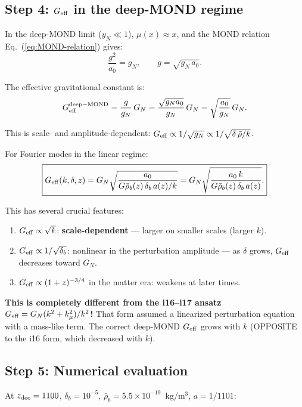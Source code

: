 \documentclass[11pt]{article}
\newcommand{\ee}[1]{\times 10^{#1}}
\newcommand{\Geff}{G_{\rm eff}}
\newcommand{\kmu}{k_\mu}
\begin{document}
\subsection{Step 4: $\Geff$ in the deep-MOND regime}

In the deep-MOND limit ($y_N \ll 1$), $\mu(x) \approx x$, and
the MOND relation Eq.~(\ref{eq:MOND-relation}) gives:
\begin{equation}
\frac{g^2}{a_0} = g_N, \qquad g = \sqrt{g_N\,a_0}.
\end{equation}

The effective gravitational constant is:
\begin{equation}
\Geff^{\rm deep-MOND} = \frac{g}{g_N}\,G_N
= \frac{\sqrt{g_N a_0}}{g_N}\,G_N = \sqrt{\frac{a_0}{g_N}}\,G_N.
\end{equation}

This is scale- and amplitude-dependent: $\Geff \propto 1/\sqrt{g_N}
\propto 1/\sqrt{\delta\,\bar\rho/k}$.

For Fourier modes in the linear regime:
\begin{equation}
\boxed{
\Geff(k, \delta, z) = G_N\sqrt{\frac{a_0}{G\bar\rho_b(z)\,\delta_b\,a(z)/k}}
= G_N\sqrt{\frac{a_0\,k}{G\bar\rho_b(z)\,\delta_b\,a(z)}}.
}
\label{eq:Geff-deep-MOND}
\end{equation}

This has several crucial features:
\begin{enumerate}
\item $\Geff \propto \sqrt{k}$: \textbf{scale-dependent} --- larger on
  smaller scales (larger $k$).
\item $\Geff \propto 1/\sqrt{\delta_b}$: nonlinear in the perturbation
  amplitude --- as $\delta$ grows, $\Geff$ decreases toward $G_N$.
\item $\Geff \propto (1+z)^{-3/4}$ in the matter era: weakens at
  later times.
\end{enumerate}

\textbf{This is completely different from the i16--i17 ansatz
$\Geff = G_N(k^2+\kmu^2)/k^2$!} That form assumed a linearized
perturbation equation with a mass-like term. The correct deep-MOND
$\Geff$ grows with $k$ (OPPOSITE to the i16 form, which decreased
with $k$).

\subsection{Step 5: Numerical evaluation}

At $z_{\rm dec} = 1100$, $\delta_b = 10^{-5}$, $\bar\rho_b = 5.5\ee{-19}$~kg/m$^3$,
$a = 1/1101$:
\end{document}
